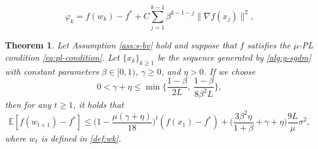 \documentclass[10pt,a4paper]{amsart}
\newtheorem{theorem}{Theorem}
\newcommand{\ebb}{\mathbb{E}}  %
\begin{document}
\begin{equation}\label{def:varphi}
\varphi_k=f(w_k)-f^*+C \sum_{j=1}^{k-1} \beta^{k-1-j}\|\nabla f(x_j)\|^2,
\end{equation}

\begin{theorem}\label{thm:pl}
Let Assumption \ref{ass:s-bv} hold and suppose that $f$ satisfies the $\mu$-PL condition \eqref{eq:pl-condition}. Let $\{x_k\}_{k\ge 1}$ be the sequence generated by \eqref{alg:g-sgdm} with constant parameters $\beta\in [0,1)$, $\gamma\ge 0$, and $\eta>0$. If we choose
\begin{equation}\label{eq:pl-lr}
    0<\gamma+\eta \leq \min\Big\{\frac{1-\beta}{2 L},~\frac{1-\beta}{8 \beta^2 L}\Big\},
\end{equation}
then for any $t\ge 1$, it holds that
\[
\ebb[f(w_{t+1})-f^*]\leq\Big(1-\frac{\mu(\gamma+\eta)}{18}\Big)^{t}(f(x_1)-f^*)+\Big(\frac{3 \beta^2 \eta}{1+\beta}+\gamma+\eta\Big) \frac{9L}{\mu} \sigma^2,
\]
where $w_t$ is defined in \eqref{def:wk}.
\end{theorem}
\end{document}
